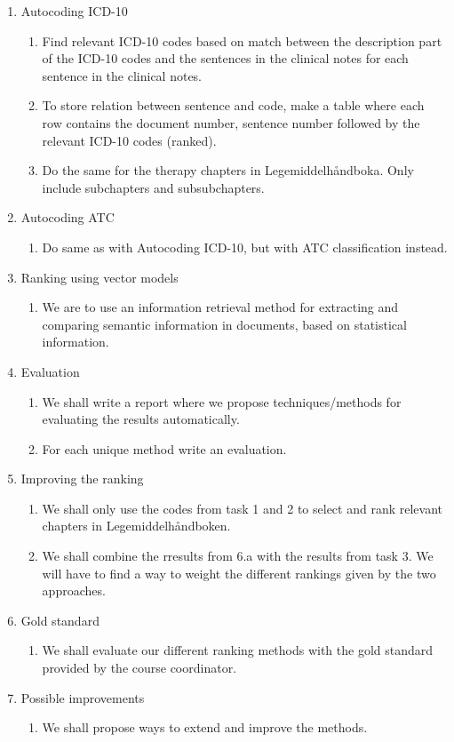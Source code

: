 \begin{enumerate}
\item{Autocoding ICD-10}
\begin{enumerate}
\item{Find relevant ICD-10 codes based on match between the description part of the ICD-10 codes and the sentences in the clinical notes for each sentence in the clinical notes.}
\item{To store relation between sentence and code, make a table where each row contains the document number, sentence number followed by the relevant ICD-10 codes (ranked).}
\item{Do the same for the therapy chapters in Legemiddelhåndboka. Only include subchapters and subsubchapters.}
\end{enumerate}
\item{Autocoding ATC}
\begin{enumerate}
\item{Do same as with Autocoding ICD-10, but with ATC classification instead.}
\end{enumerate}
\item{Ranking using vector models}
\begin{enumerate}
\item{We are to use an information retrieval method for extracting and comparing semantic information in documents, based on statistical information.}
\end{enumerate}
\item{Evaluation}
\begin{enumerate}
\item{We shall write a report where we propose techniques/methods for evaluating the results automatically.}
\item{For each unique method write an evaluation.}
\end{enumerate}
\item{Improving the ranking}
\begin{enumerate}
\item{We shall only use the codes from task 1 and 2 to select and rank relevant chapters in Legemiddelhåndboken.}
\item{We shall combine the rresults from 6.a with the results from task 3. We will have to find a way to weight the different rankings given by the two approaches.}
\end{enumerate}
\item{Gold standard}
\begin{enumerate}
\item{We shall evaluate our different ranking methods with the gold standard provided by the course coordinator.}
\end{enumerate}
\item{Possible improvements}
\begin{enumerate}
\item{We shall propose ways to extend and improve the methods.}
\end{enumerate}
\end{enumerate}